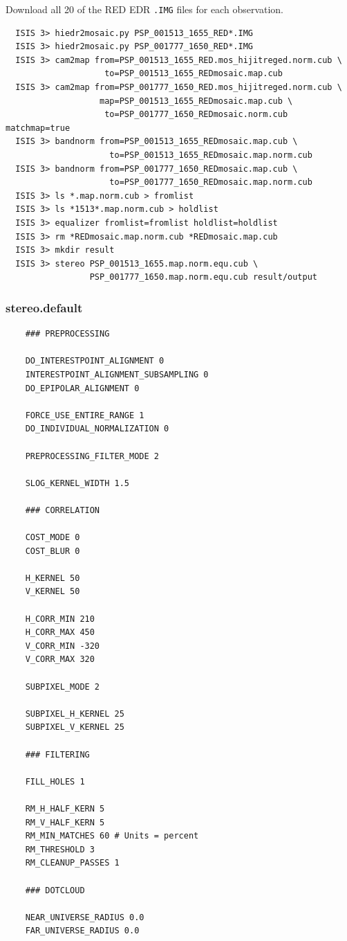 Download all 20 of the RED EDR \texttt{.IMG} files for each observation.
\begin{verbatim}
  ISIS 3> hiedr2mosaic.py PSP_001513_1655_RED*.IMG
  ISIS 3> hiedr2mosaic.py PSP_001777_1650_RED*.IMG
  ISIS 3> cam2map from=PSP_001513_1655_RED.mos_hijitreged.norm.cub \
                    to=PSP_001513_1655_REDmosaic.map.cub
  ISIS 3> cam2map from=PSP_001777_1650_RED.mos_hijitreged.norm.cub \
                   map=PSP_001513_1655_REDmosaic.map.cub \
                    to=PSP_001777_1650_REDmosaic.norm.cub matchmap=true
  ISIS 3> bandnorm from=PSP_001513_1655_REDmosaic.map.cub \
                     to=PSP_001513_1655_REDmosaic.map.norm.cub
  ISIS 3> bandnorm from=PSP_001777_1650_REDmosaic.map.cub \
                     to=PSP_001777_1650_REDmosaic.map.norm.cub
  ISIS 3> ls *.map.norm.cub > fromlist
  ISIS 3> ls *1513*.map.norm.cub > holdlist
  ISIS 3> equalizer fromlist=fromlist holdlist=holdlist
  ISIS 3> rm *REDmosaic.map.norm.cub *REDmosaic.map.cub
  ISIS 3> mkdir result
  ISIS 3> stereo PSP_001513_1655.map.norm.equ.cub \
                 PSP_001777_1650.map.norm.equ.cub result/output
\end{verbatim}

\subsubsection*{stereo.default}
\begin{verbatim}
    ### PREPROCESSING

    DO_INTERESTPOINT_ALIGNMENT 0
    INTERESTPOINT_ALIGNMENT_SUBSAMPLING 0
    DO_EPIPOLAR_ALIGNMENT 0

    FORCE_USE_ENTIRE_RANGE 1
    DO_INDIVIDUAL_NORMALIZATION 0

    PREPROCESSING_FILTER_MODE 2

    SLOG_KERNEL_WIDTH 1.5

    ### CORRELATION

    COST_MODE 0
    COST_BLUR 0

    H_KERNEL 50
    V_KERNEL 50

    H_CORR_MIN 210
    H_CORR_MAX 450
    V_CORR_MIN -320
    V_CORR_MAX 320

    SUBPIXEL_MODE 2

    SUBPIXEL_H_KERNEL 25
    SUBPIXEL_V_KERNEL 25

    ### FILTERING

    FILL_HOLES 1

    RM_H_HALF_KERN 5
    RM_V_HALF_KERN 5
    RM_MIN_MATCHES 60 # Units = percent
    RM_THRESHOLD 3
    RM_CLEANUP_PASSES 1

    ### DOTCLOUD

    NEAR_UNIVERSE_RADIUS 0.0
    FAR_UNIVERSE_RADIUS 0.0
\end{verbatim}

